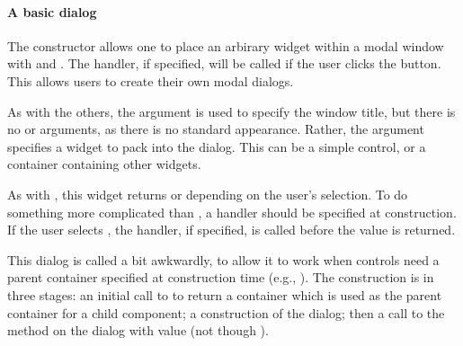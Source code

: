 \paragraph{A basic dialog}
The  constructor allows one to place an
arbirary widget within a modal window with  and
. The handler, if specified, will be called if the user
clicks the  button. This allows users to create their own
modal dialogs.

As with the others, the argument  is
used to specify the window title, but there is no  or
 arguments, as there is no standard appearance. Rather,
the  argument specifies a widget to
pack into the dialog. This can be a simple control, or a container
containing other widgets. 

As with , this widget returns  or
 depending on the user's selection. To do something more complicated than , a handler should be specified at construction. If the user selects
, the handler, if specified, is called before the value 
is returned. 

This dialog is called a bit awkwardly, to allow it to work when controls need a
parent container specified at construction time (e.g., ). The construction is in
three stages: an initial call to  to return a container which is used as
the parent container for a child component; a construction of the dialog; then a call to the
 method on the dialog with  value (not though ).


